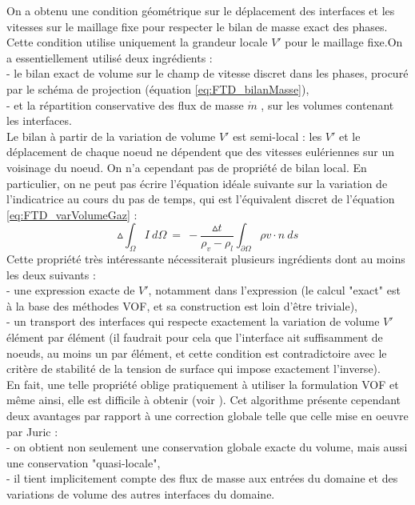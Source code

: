 On a obtenu une condition g\'eom\'etrique sur le d\'eplacement des interfaces et les vitesses sur le maillage fixe pour respecter le bilan de masse exact des phases. Cette condition utilise uniquement la grandeur locale $V'$ pour le maillage fixe.On a essentiellement utilis\'e deux ingr\'edients :\\
- le bilan exact de volume sur le champ de vitesse discret dans les phases,
procur\'e par le sch\'ema de projection (\'equation \ref{eq:FTD_bilanMasse}),\\
- et la r\'epartition conservative des flux de masse $\dot{m}$ , sur les volumes contenant les interfaces.\\
Le bilan \`a partir de la variation de volume $V'$ est semi-local : les $V'$ et le d\'eplacement de chaque noeud ne d\'ependent que des vitesses eul\'eriennes sur un voisinage du noeud. On n'a cependant pas de propri\'et\'e de bilan local. En particulier, on ne peut pas \'ecrire l'\'equation id\'eale suivante sur la variation de l'indicatrice au cours du pas de temps, qui est l'\'equivalent discret de l'\'equation \ref{eq:FTD_varVolumeGaz} :
\begin{equation}
\vartriangle \int_{\Omega} I\:d\Omega\:=\:-\dfrac{\vartriangle t}{\rho_{v}-\rho_{l}} \int_{\partial\Omega} \rho v \cdot n\:ds
\end{equation}
Cette propri\'et\'e très int\'eressante n\'ecessiterait plusieurs ingr\'edients dont au moins les deux suivants :\\
- une expression exacte de $V'$, notamment dans l'expression (le calcul "exact" est \`a la base des m\'ethodes VOF, et sa construction est loin d'\^etre triviale),\\
- un transport des interfaces qui respecte exactement la variation de volume $V'$ \'el\'ement par \'el\'ement (il faudrait pour cela que l'interface ait suffisamment de noeuds, au moins un par \'el\'ement, et cette condition est
contradictoire avec le crit\`ere de stabilit\'e de la tension de surface qui impose exactement l'inverse).\\
En fait, une telle propri\'et\'e oblige pratiquement \`a utiliser la formulation VOF et m\^eme ainsi, elle est difficile \`a obtenir (voir \cite{Aulisa2003}).
Cet algorithme pr\'esente cependant deux avantages par rapport \`a une correction globale telle que celle mise en oeuvre par Juric \cite{Shin2002} :\\
- on obtient non seulement une conservation globale exacte du volume, mais aussi une conservation "quasi-locale",\\
- il tient implicitement compte des flux de masse aux entr\'ees du domaine et des variations de volume des autres interfaces du domaine.
